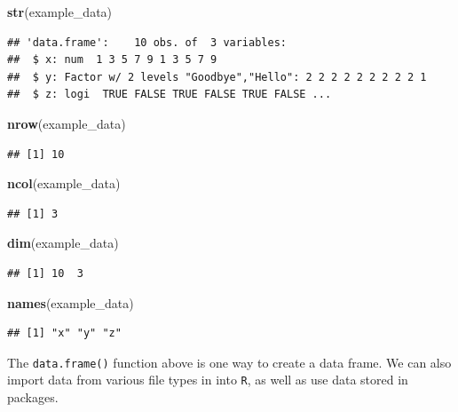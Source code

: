 \documentclass[]{book}
\newenvironment{Shaded}{\begin{snugshade}}{\end{snugshade}}
\newcommand{\KeywordTok}[1]{\textcolor[rgb]{0.13,0.29,0.53}{\textbf{#1}}}
\newcommand{\NormalTok}[1]{#1}
\theoremstyle{definition}
\theoremstyle{definition}
\theoremstyle{definition}
\theoremstyle{remark}
\begin{document}
\begin{Shaded}
\begin{Highlighting}[]
\KeywordTok{str}\NormalTok{(example_data)}
\end{Highlighting}
\end{Shaded}

\begin{verbatim}
## 'data.frame':    10 obs. of  3 variables:
##  $ x: num  1 3 5 7 9 1 3 5 7 9
##  $ y: Factor w/ 2 levels "Goodbye","Hello": 2 2 2 2 2 2 2 2 2 1
##  $ z: logi  TRUE FALSE TRUE FALSE TRUE FALSE ...
\end{verbatim}

\begin{Shaded}
\begin{Highlighting}[]
\KeywordTok{nrow}\NormalTok{(example_data)}
\end{Highlighting}
\end{Shaded}

\begin{verbatim}
## [1] 10
\end{verbatim}

\begin{Shaded}
\begin{Highlighting}[]
\KeywordTok{ncol}\NormalTok{(example_data)}
\end{Highlighting}
\end{Shaded}

\begin{verbatim}
## [1] 3
\end{verbatim}

\begin{Shaded}
\begin{Highlighting}[]
\KeywordTok{dim}\NormalTok{(example_data)}
\end{Highlighting}
\end{Shaded}

\begin{verbatim}
## [1] 10  3
\end{verbatim}

\begin{Shaded}
\begin{Highlighting}[]
\KeywordTok{names}\NormalTok{(example_data)}
\end{Highlighting}
\end{Shaded}

\begin{verbatim}
## [1] "x" "y" "z"
\end{verbatim}

The \texttt{data.frame()} function above is one way to create a data
frame. We can also import data from various file types in into
\texttt{R}, as well as use data stored in packages.
\end{document}
